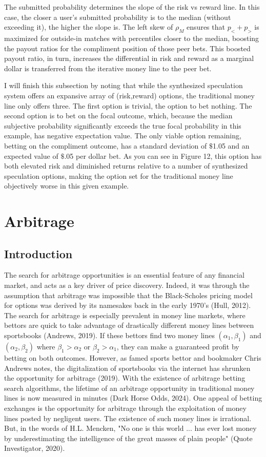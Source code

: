 \documentclass[sn-mathphys-num]{sn-jnl}
\theoremstyle{thmstyleone}%
\theoremstyle{thmstyletwo}%
\theoremstyle{thmstylethree}%
\begin{document}
The submitted probability determines the slope of the risk vs reward line. In this case, the closer a user's submitted probability is to the median (without exceeding it), the higher the slope is. The left skew of $\rho_M$ ensures that $p_< + p_>$ is maximized for outside-in matches with percentiles closer to the median, boosting the payout ratios for the compliment position of those peer bets. This boosted payout ratio, in turn, increases the differential in risk and reward as a marginal dollar is transferred from the iterative money line to the peer bet. 

I will finish this subsection by noting that while the synthesized speculation system offers an expansive array of (risk,reward) options, the traditional money line only offers three. The first option is trivial, the option to bet nothing. The second option is to bet on the focal outcome, which, because the median subjective probability significantly exceeds the true focal probability in this example, has negative expectation value. The only viable option remaining, betting on the compliment outcome, has a standard deviation of $\$$1.05 and an expected value of $\$$.05 per dollar bet. As you can see in Figure 12, this option has both elevated risk and diminished returns relative to a number of synthesized speculation options, making the option set for the traditional money line objectively worse in this given example.

\section{Arbitrage}

\subsection{Introduction}

The search for arbitrage opportunities is an essential feature of any financial market, and acts as a key driver of price discovery. Indeed, it was through the assumption that arbitrage was impossible that the Black-Scholes pricing model for options was derived by its namesakes back in the early 1970's (Hull, 2012). The search for arbitrage is especially prevalent in money line markets, where bettors are quick to take advantage of drastically different money lines between sportsbooks (Andrews, 2019). If these bettors find two money lines $(\alpha_1,\beta_1)$ and $(\alpha_2,\beta_2)$ where $\beta_1>\alpha_2$ or $\beta_2>\alpha_1$, they can make a guaranteed profit by betting on both outcomes. However, as famed sports bettor and bookmaker Chris Andrews notes, the digitalization of sportsbooks via the internet has shrunken the opportunity for arbitrage (2019). With the existence of arbitrage betting search algorithms, the lifetime of an arbitrage opportunity in traditional money lines is now measured in minutes (Dark Horse Odds, 2024). One appeal of betting exchanges is the opportunity for arbitrage through the exploitation of money lines posted by negligent users. The existence of such money lines is irrational. But, in the words of H.L. Mencken, "No one is this world ... has ever lost money by underestimating the intelligence of the great masses of plain people" (Quote Investigator, 2020).
\end{document}
